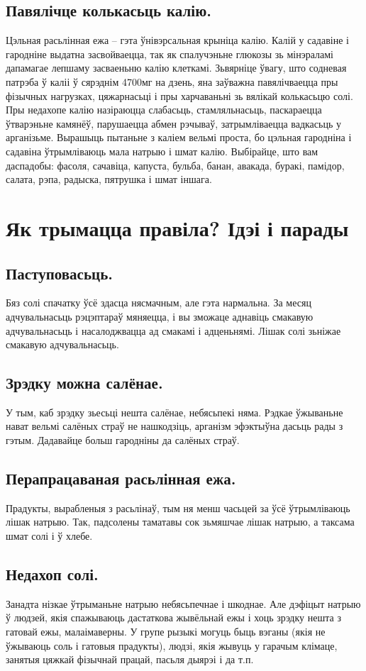 \subsection{Павялічце колькасьць калію.}
Цэльная расьлінная ежа – гэта ўнівэрсальная крыніца калію. Калій у садавіне і гародніне выдатна засвойваецца, так як спалучэньне глюкозы зь мінэраламі дапамагае лепшаму засваеньню калію клеткамі. Зьвярніце ўвагу, што содневая патрэба ў каліі ў сярэднім 4700мг на дзень, яна заўважна павялічваецца пры фізычных нагрузках, цяжарнасьці і пры харчаваньні зь вялікай колькасьцю солі. Пры недахопе калію назіраюцца слабасьць, стамляльнасьць, паскараецца ўтварэньне камянёў, парушаецца абмен рэчываў, затрымліваецца вадкасьць у арганізьме. Вырашыць пытаньне з каліем вельмі проста, бо цэльная гародніна і садавіна ўтрымліваюць мала натрыю і шмат калію. Выбірайце, што вам даспадобы: фасоля, сачавіца, капуста, бульба, банан, авакада, буракі, памідор, салата, рэпа, радыска, пятрушка і шмат іншага.

\section{Як трымацца правіла? Ідэі і парады}

\subsection{Паступовасьць.}
Бяз солі спачатку ўсё здасца нясмачным, але гэта нармальна. За месяц адчувальнасьць рэцэптараў мяняецца, і вы зможаце аднавіць смакавую адчувальнасьць і насалоджвацца ад смакамі і адценьнямі. Лішак солі зьніжае смакавую адчувальнасьць.

\subsection{Зрэдку можна салёнае.}
У тым, каб зрэдку зьесьці нешта салёнае, небясьпекі няма. Рэдкае ўжываньне нават вельмі салёных страў не нашкодзіць, арганізм эфэктыўна дасьць рады з гэтым. Дадавайце больш гародніны да салёных страў.

\subsection{Перапрацаваная расьлінная ежа.}
Прадукты, вырабленыя з расьлінаў, тым ня менш часьцей за ўсё ўтрымліваюць лішак натрыю. Так, падсолены таматавы сок зьмяшчае лішак натрыю, а таксама шмат солі і ў хлебе.

\subsection{Недахоп солі.}
Занадта нізкае ўтрыманьне натрыю небясьпечнае і шкоднае. Але дэфіцыт натрыю ў людзей, якія спажываюць дастаткова жывёльнай ежы і хоць зрэдку нешта з гатовай ежы, малаімаверны. У групе рызыкі могуць быць вэганы (якія не ўжываюць соль і гатовыя прадукты), людзі, якія жывуць у гарачым клімаце, занятыя цяжкай фізычнай працай, пасьля дыярэі і да т.п.

